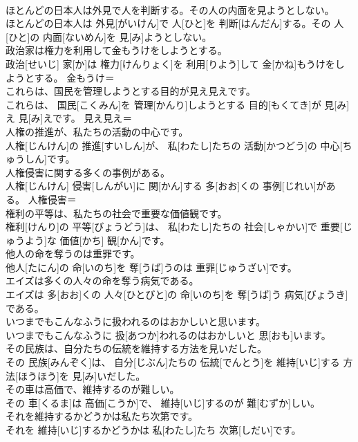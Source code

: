 \documentclass[8pt]{extreport}
\begin{document}
\begin{CJK}{UTF8}{min}
\\	ほとんどの日本人は外見で人を判断する。その人の内面を見ようとしない。	
\\	ほとんどの日本人は 外見[がいけん]で 人[ひと]を 判断[はんだん]する。その 人[ひと]の 内面[ないめん]を 見[み]ようとしない。	
\\	政治家は権力を利用して金もうけをしようとする。	
\\	政治[せいじ] 家[か]は 権力[けんりょく]を 利用[りよう]して 金[かね]もうけをしようとする。	金もうけ＝ 
\\	これらは、国民を管理しようとする目的が見え見えです。	
\\	これらは、 国民[こくみん]を 管理[かんり]しようとする 目的[もくてき]が 見[み]え 見[み]えです。	見え見え＝ 
\\	人権の推進が、私たちの活動の中心です。	
\\	人権[じんけん]の 推進[すいしん]が、 私[わたし]たちの 活動[かつどう]の 中心[ちゅうしん]です。	
\\	人権侵害に関する多くの事例がある。	
\\	人権[じんけん] 侵害[しんがい]に 関[かん]する 多[おお]くの 事例[じれい]がある。	人権侵害＝
\\	権利の平等は、私たちの社会で重要な価値観です。	
\\	権利[けんり]の 平等[びょうどう]は、 私[わたし]たちの 社会[しゃかい]で 重要[じゅうよう]な 価値[かち] 観[かん]です。	
\\	他人の命を奪うのは重罪です。	
\\	他人[たにん]の 命[いのち]を 奪[うば]うのは 重罪[じゅうざい]です。	
\\	エイズは多くの人々の命を奪う病気である。	
\\	エイズは 多[おお]くの 人々[ひとびと]の 命[いのち]を 奪[うば]う 病気[びょうき]である。	
\\	いつまでもこんなふうに扱われるのはおかしいと思います。	
\\	いつまでもこんなふうに 扱[あつか]われるのはおかしいと 思[おも]います。	
\\	その民族は、自分たちの伝統を維持する方法を見いだした。	
\\	その 民族[みんぞく]は、 自分[じぶん]たちの 伝統[でんとう]を 維持[いじ]する 方法[ほうほう]を 見[み]いだした。	
\\	その車は高価で、維持するのが難しい。	
\\	その 車[くるま]は 高価[こうか]で、 維持[いじ]するのが 難[むずか]しい。	
\\	それを維持するかどうかは私たち次第です。	
\\	それを 維持[いじ]するかどうかは 私[わたし]たち 次第[しだい]です。	

\end{CJK}
\end{document}
